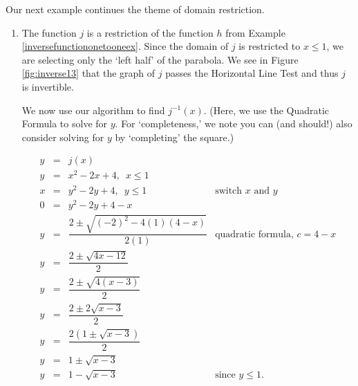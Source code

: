 Our next example continues the theme of domain restriction.

\pagebreak

{
\begin{enumerate}

\item  The function $j$ is a restriction of the function $h$ from Example \ref{inversefunctiononetooneex}.  Since the domain of $j$ is restricted to $x \leq 1$, we are selecting only the `left half' of the parabola.  We see in Figure \ref{fig:inverse13} that the graph of $j$ passes the Horizontal Line Test and thus $j$ is invertible.


We now use our algorithm to find $j^{-1}(x)$. (Here, we use the Quadratic Formula to solve for $y$.  For `completeness,' we note you can (and should!) also consider solving for $y$ by `completing' the square.)

\[ \begin{array}{rclr}
y & = & j(x) & \\
y & = & x^2-2x+4, \, \, \, x \leq 1 \\
x & = & y^2 - 2y+4, \, \, \, y \leq 1 & \mbox{switch $x$ and $y$} \\
0 & = & y^2 - 2y + 4-x & \\
y & = & \dfrac{2 \pm \sqrt{(-2)^2-4(1)(4-x)}}{2(1)} & \mbox{quadratic formula, $c=4-x$} \\ [10pt]
y & = & \dfrac{2 \pm \sqrt{4x-12}}{2} & \\ [6pt]
y & = & \dfrac{2 \pm \sqrt{4(x-3)}}{2} & \\ [6pt]
y & = & \dfrac{2 \pm 2\sqrt{x-3}}{2} & \\ [6pt]
y & = & \dfrac{2\left(1 \pm \sqrt{x-3}\right)}{2} & \\ [6pt]
y & = & 1 \pm \sqrt{x-3} & \\
y & = & 1 - \sqrt{x-3} & \mbox{since $y \leq 1$.} \\
\end{array}\]


\end{enumerate}}
